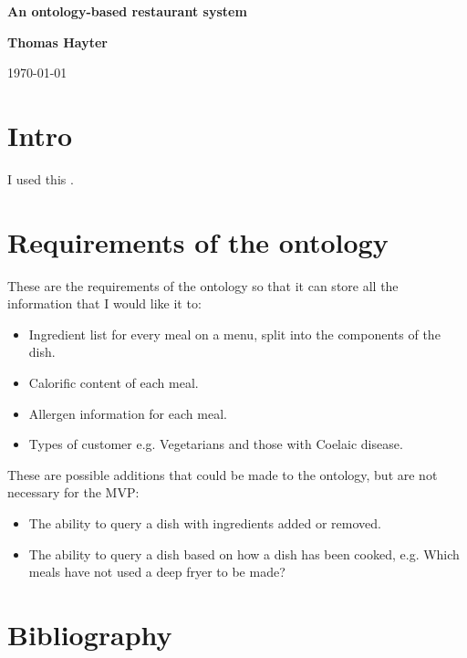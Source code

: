 \documentclass{article}
\begin{document}
\begin{titlepage}
\begin{center}
\vspace*{5cm}

\Huge
\textbf{An ontology-based restaurant system}

\vspace{1cm}

\Large
\textbf{Thomas Hayter}

\vspace{1cm}

\today
\end{center}
\end{titlepage}

\tableofcontents

\section{Intro}
I used this \cite{pizza_tutorial_pdf}.

\section{Requirements of the ontology}

These are the requirements of the ontology so that it can store all the information that I would like it to:

\begin{itemize}
\item Ingredient list for every meal on a menu, split into the components of the dish.
\item Calorific content of each meal.
\item Allergen information for each meal.
\item Types of customer e.g. Vegetarians and those with Coelaic disease.
\end{itemize}

These are possible additions that could be made to the ontology, but are not necessary for the MVP:

\begin{itemize}
\item The ability to query a dish with ingredients added or removed.
\item The ability to query a dish based on how a dish has been cooked, e.g. Which meals have not used a deep fryer to be made?
\end{itemize}

\section{Bibliography}


\end{document}
